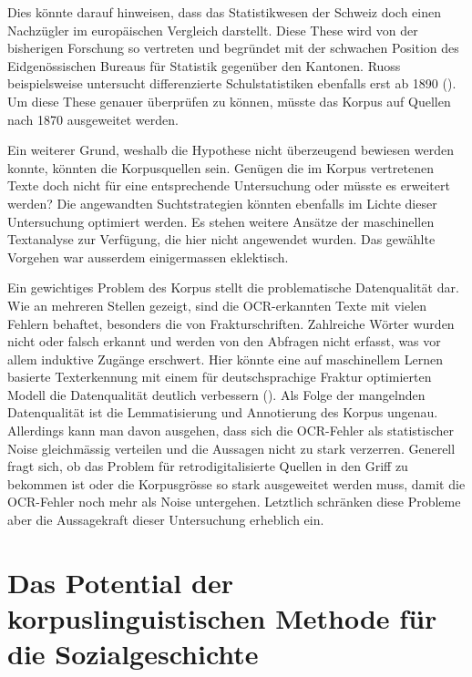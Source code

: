 Dies könnte darauf hinweisen, dass das Statistikwesen der Schweiz doch einen Nachzügler im europäischen Vergleich darstellt. Diese These wird von der bisherigen Forschung so vertreten und begründet mit der schwachen Position des Eidgenössischen Bureaus für Statistik gegenüber den Kantonen. Ruoss beispielsweise untersucht differenzierte Schulstatistiken ebenfalls erst ab 1890 (\cite{ruoss_zahlen_2018}). Um diese These genauer überprüfen zu können, müsste das Korpus auf Quellen nach 1870 ausgeweitet werden.

Ein weiterer Grund, weshalb die Hypothese nicht überzeugend bewiesen werden konnte, könnten die Korpusquellen sein. Genügen die im Korpus vertretenen Texte doch nicht für eine entsprechende Untersuchung oder müsste es erweitert werden? Die angewandten Suchtstrategien könnten ebenfalls im Lichte dieser Untersuchung optimiert werden. Es stehen weitere Ansätze der maschinellen Textanalyse zur Verfügung, die hier nicht angewendet wurden. Das gewählte Vorgehen war ausserdem einigermassen eklektisch. 

Ein gewichtiges Problem des Korpus stellt die problematische Datenqualität dar. Wie an mehreren Stellen gezeigt, sind die OCR-erkannten Texte mit vielen Fehlern behaftet, besonders die von Frakturschriften. Zahlreiche Wörter wurden nicht oder falsch erkannt und werden von den Abfragen nicht erfasst, was vor allem induktive Zugänge erschwert. Hier könnte eine auf maschinellem Lernen basierte Texterkennung mit einem für deutschsprachige Fraktur optimierten Modell die Datenqualität deutlich verbessern (\cite{noauthor_german_2022,noauthor_druckwerke_2022}). Als Folge der mangelnden Datenqualität ist die Lemmatisierung und Annotierung des Korpus ungenau. Allerdings kann man davon ausgehen, dass sich die OCR-Fehler als statistischer Noise gleichmässig verteilen und die Aussagen nicht zu stark verzerren. Generell fragt sich, ob das Problem für retrodigitalisierte Quellen in den Griff zu bekommen ist oder die Korpusgrösse so stark ausgeweitet werden muss, damit die OCR-Fehler noch mehr als Noise untergehen. Letztlich schränken diese Probleme aber die Aussagekraft dieser Untersuchung erheblich ein. 


\section{Das Potential der korpuslinguistischen Methode für die Sozialgeschichte}

